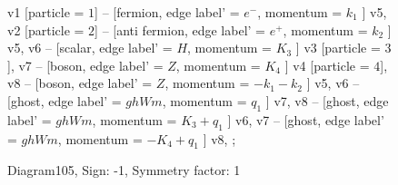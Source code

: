 \documentclass{revtex4}
\begin{document}
\begin{figure}[!htb]
\begin{center}
{    %
v1 [particle = \(1\)] -- [fermion, edge label' = \(e^{-}\), momentum = \(k_{1}\) ] v5, 
v2 [particle = \(2\)] -- [anti fermion, edge label' = \(e^{+}\), momentum = \(k_{2}\) ] v5, 
v6 -- [scalar, edge label' = \(H\), momentum = \(K_{3}\) ] v3 [particle = \(3\)], 
v7 -- [boson, edge label' = \(Z\), momentum = \(K_{4}\) ] v4 [particle = \(4\)], 
v8 -- [boson, edge label' = \(Z\), momentum = \(-k_{1} - k_{2}\) ] v5, 
v6 -- [ghost, edge label' = \(ghWm\), momentum = \(q_{1}\) ] v7, 
v8 -- [ghost, edge label' = \(ghWm\), momentum = \(K_{3} + q_{1}\) ] v6, 
v7 -- [ghost, edge label' = \(ghWm\), momentum = \(-K_{4} + q_{1}\) ] v8, 
};
\end{center}
\caption{Diagram105, Sign: -1, Symmetry factor: 1}
\end{figure}
\newpage
\end{document}
